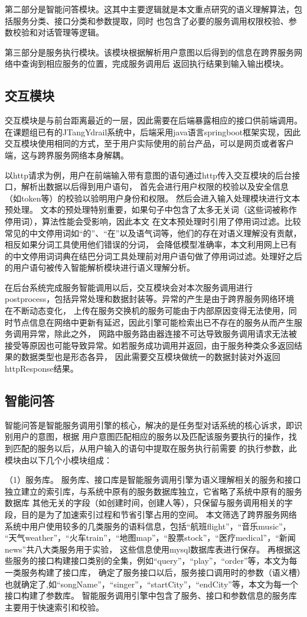 第二部分是智能问答模块。这其中主要逻辑就是本文重点研究的语义理解算法，包括服务分类、接口分类和参数提取，同时
也包含了必要的服务调用权限校验、参数校验和对话管理等逻辑。

第三部分是服务执行模块。该模块根据解析用户意图以后得到的信息在跨界服务网络中查询到相应服务的位置，完成服务调用后
返回执行结果到输入输出模块。

\subsection{交互模块}
交互模块是与前台距离最近的一层，因此需要在后端暴露相应的接口供前端调用。在课题组已有的JTangYdrail系统中，后端采用java语言springboot框架实现，因此
交互模块使用相同的方式，至于用户实际使用的前台产品，可以是网页或者客户端，这与跨界服务网络本身解耦。

以http请求为例，用户在前端输入带有意图的语句通过http传入交互模块的后台接口，解析出数据以后得到用户语句，
首先会进行用户权限的校验以及安全信息（如token等）的校验以验明用户身份和权限。
然后会进入输入处理模块进行文本预处理。
文本的预处理特别重要，如果句子中包含了太多无关词（这些词被称作停用词），算法性能会受影响，因此本文
在文本预处理时引用了停用词过滤。比较常见的中文停用词如“的”、“在”以及语气词等，他们的存在对语义理解没有贡献，相反如果分词工具使用他们错误的分词，
会降低模型准确率，本文利用网上已有的中文停用词词典在结巴分词工具处理前对用户语句做了停用词过滤。处理好之后的用户语句被传入智能解析模块进行语义理解分析。

在后台系统完成服务智能调用以后，交互模块会对本次服务调用进行postprocess，包括异常处理和数据封装等。异常的产生是由于跨界服务网络环境在不断动态变化，
上传在服务交换机的服务可能由于内部原因变得无法使用，同时节点信息在网络中更新有延迟，因此引擎可能检索出已不存在的服务从而产生服务调用异常，除此之外，
网路中服务路由器连接不可达导致服务调用请求无法被接受等原因也可能导致异常。如若服务成功调用并返回，由于服务种类众多返回结果的数据类型也是形态各异，
因此需要交互模块做统一的数据封装对外返回httpResponse结果。

\subsection{智能问答}
智能问答是智能服务调用引擎的核心，解决的是任务型对话系统的核心诉求，即识别用户的意图，根据
用户意图匹配相应的服务以及匹配该服务要执行的操作，找到匹配的服务以后，从用户输入的语句中提取在服务执行前需要
的执行参数，此模块由以下几个小模块组成：

（1）服务库。
服务库、接口库是智能服务调用引擎为语义理解相关的服务和接口独立建立的索引库，与系统中原有的服务数据库独立，它省略了系统中原有的服务数据库
其他无关的字段（如创建时间，创建人等），只保留与服务调用相关的字段，目的是为了加速索引过程和节省引擎占用的空间。
本文筛选了跨界服务网络系统中用户使用较多的几类服务的语料信息，包括“航班flight”，“音乐music”，
“天气weather”，“火车train”，“地图map”，“股票stock”，“医疗medical”，“新闻news”共八大类服务用于实验，
这些信息使用mysql数据库表进行保存。
再根据这些服务的接口构建接口类别的全集，例如“query”，“play”，“order”等，本文为每一类服务构建了接口库，
确定了服务接口以后，服务接口调用时的参数（语义槽）也就确定了,如“songName”，“singer”，“startCity”，“endCity”等，本文为每一个接口构建了参数库。
智能服务调用引擎中包含了服务、接口和参数信息的服务库主要用于快速索引和校验。

